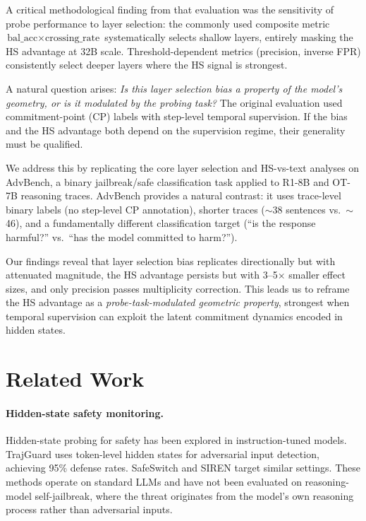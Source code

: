 \documentclass[11pt]{article}
\begin{document}
A critical methodological finding from that evaluation was the sensitivity of probe performance to layer selection: the commonly used composite metric $\text{bal\_acc} \times \text{crossing\_rate}$ systematically selects shallow layers, entirely masking the HS advantage at 32B scale. Threshold-dependent metrics (precision, inverse FPR) consistently select deeper layers where the HS signal is strongest.

A natural question arises: \emph{Is this layer selection bias a property of the model's geometry, or is it modulated by the probing task?} The original evaluation used commitment-point (CP) labels with step-level temporal supervision. If the bias and the HS advantage both depend on the supervision regime, their generality must be qualified.

We address this by replicating the core layer selection and HS-vs-text analyses on AdvBench, a binary jailbreak/safe classification task applied to R1-8B and OT-7B reasoning traces. AdvBench provides a natural contrast: it uses trace-level binary labels (no step-level CP annotation), shorter traces ($\sim$38 sentences vs.\ $\sim$46), and a fundamentally different classification target (``is the response harmful?'' vs.\ ``has the model committed to harm?'').

Our findings reveal that layer selection bias replicates directionally but with attenuated magnitude, the HS advantage persists but with 3--5$\times$ smaller effect sizes, and only precision passes multiplicity correction. This leads us to reframe the HS advantage as a \emph{probe-task-modulated geometric property}, strongest when temporal supervision can exploit the latent commitment dynamics encoded in hidden states.

\section{Related Work}
\label{sec:related}

\paragraph{Hidden-state safety monitoring.}
Hidden-state probing for safety has been explored in instruction-tuned models. TrajGuard uses token-level hidden states for adversarial input detection, achieving 95\% defense rates. SafeSwitch and SIREN target similar settings. These methods operate on standard LLMs and have not been evaluated on reasoning-model self-jailbreak, where the threat originates from the model's own reasoning process rather than adversarial inputs.
\end{document}
